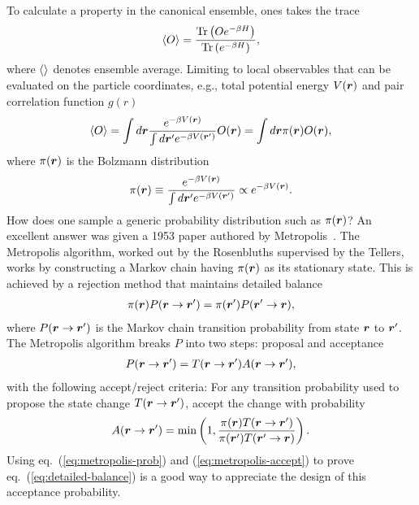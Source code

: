 To calculate a property in the canonical ensemble, ones takes the trace
\begin{align}
\braket{O} = \dfrac{\text{Tr}\left(Oe^{-\beta H}\right)}{\text{Tr}\left(e^{-\beta H}\right)},
\end{align}
where $\braket{}$ denotes ensemble average. Limiting to local observables that can be evaluated on the particle coordinates, e.g., total potential energy $V(\boldsymbol{r})$ and pair correlation function $g(r)$
\begin{align}
\braket{O} = \int d\boldsymbol{r} \dfrac{e^{-\beta V(\boldsymbol{r})}}{\int d\boldsymbol{r}' e^{-\beta V(\boldsymbol{r}')}} O(\boldsymbol{r}) = \int d\boldsymbol{r} \pi(\boldsymbol{r})O(\boldsymbol{r}),
\end{align}
where $\pi(\boldsymbol{r})$ is the Bolzmann distribution
\begin{align}
\pi(\boldsymbol{r}) \equiv \dfrac{e^{-\beta V(\boldsymbol{r})}}{\int d\boldsymbol{r}' e^{-\beta V(\boldsymbol{r}')}} \propto e^{-\beta V(\boldsymbol{r})}.
\end{align}
How does one sample a generic probability distribution such as $\pi(\boldsymbol{r})$?
An excellent answer was given a 1953 paper authored by Metropolis~\cite{Metropolis1953}. The Metropolis algorithm, worked out by the Rosenbluths supervised by the Tellers, works by constructing a Markov chain having $\pi(\boldsymbol{r})$ as its stationary state. This is achieved by a rejection method that maintains detailed balance
\begin{align} \label{eq:detailed-balance}
\pi(\boldsymbol{r})P(\boldsymbol{r}\rightarrow\boldsymbol{r}')=\pi(\boldsymbol{r}')P(\boldsymbol{r}'\rightarrow\boldsymbol{r}),
\end{align}
where $P(\boldsymbol{r}\rightarrow\boldsymbol{r}')$ is the Markov chain transition probability from state $\boldsymbol{r}$ to $\boldsymbol{r}'$. The Metropolis algorithm breaks $P$ into two steps: proposal and acceptance
\begin{align} \label{eq:metropolis-prob}
P(\boldsymbol{r}\rightarrow\boldsymbol{r}') = T(\boldsymbol{r}\rightarrow\boldsymbol{r}')A(\boldsymbol{r}\rightarrow\boldsymbol{r}'),
\end{align}
with the following accept/reject criteria: For any transition probability used to propose the state change $T(\boldsymbol{r}\rightarrow\boldsymbol{r}')$, accept the change with probability
\begin{align} \label{eq:metropolis-accept}
A(\boldsymbol{r}\rightarrow\boldsymbol{r}') = \min\left(1, \dfrac{\pi(\boldsymbol{r})T(\boldsymbol{r}\rightarrow\boldsymbol{r}')}{\pi(\boldsymbol{r}')T(\boldsymbol{r}'\rightarrow\boldsymbol{r})}\right).
\end{align}
Using eq.~(\ref{eq:metropolis-prob}) and (\ref{eq:metropolis-accept}) to prove eq.~(\ref{eq:detailed-balance}) is a good way to appreciate the design of this acceptance probability.

